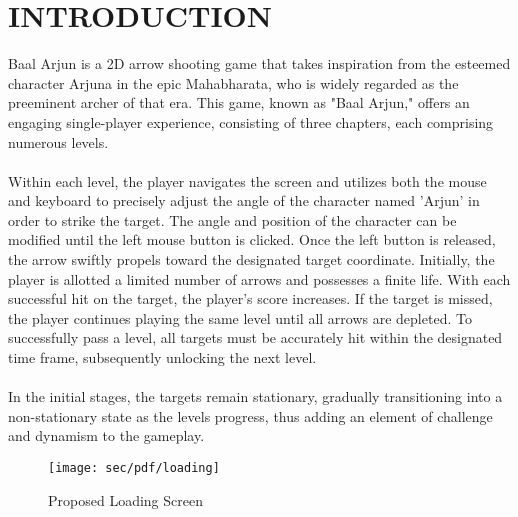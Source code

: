 \newpage
{}
\section{INTRODUCTION}
Baal Arjun is a 2D arrow shooting game that takes inspiration from the esteemed character Arjuna in the epic Mahabharata, who is widely regarded as the preeminent archer of that era. This game, known as "Baal Arjun," offers an engaging single-player experience, consisting of three chapters, each comprising numerous levels.\\\\
Within each level, the player navigates the screen and utilizes both the mouse and keyboard to precisely adjust the angle of the character named 'Arjun' in order to strike the target. The angle and position of the character can be modified until the left mouse button is clicked. Once the left button is released, the arrow swiftly propels toward the designated target coordinate. Initially, the player is allotted a limited number of arrows and possesses a finite life. With each successful hit on the target, the player's score increases. If the target is missed, the player continues playing the same level until all arrows are depleted. To successfully pass a level, all targets must be accurately hit within the designated time frame, subsequently unlocking the next level.\\\\
In the initial stages, the targets remain stationary, gradually transitioning into a non-stationary state as the levels progress, thus adding an element of challenge and dynamism to the gameplay.
\\
\vspace{1.5 cm}
\begin{figure}[h]
	
	\centering
	\texttt{[image: sec/pdf/loading]}
	\caption{Proposed Loading Screen}
\end{figure}
